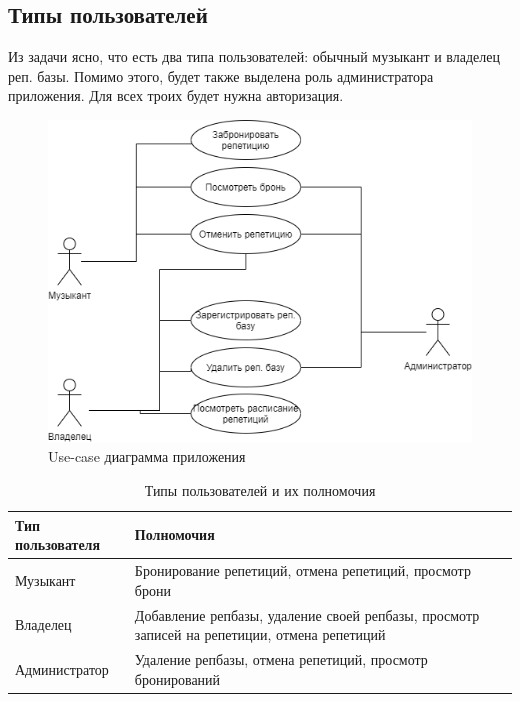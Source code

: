 \subsection{Типы пользователей}

Из задачи ясно, что есть два типа пользователей: обычный музыкант и владелец реп. базы. Помимо этого, будет также выделена роль администратора приложения. Для всех троих будет нужна авторизация.

\begin{figure}[h!]
	\begin{center}
		\includegraphics[scale=0.7]{inc/img/Use-Case.png}
	\end{center}
	\captionsetup{justification=centering}
	\caption{Use-case диаграмма приложения}
\end{figure}

\begin{table}[!h]
	\captionsetup{justification=centering}
	\caption{Типы пользователей и их полномочия}
	\begin{center}
		\begin{tabular}{|p{}|p{}|}
			\hline
			\textbf{Тип пользователя} & \textbf{Полномочия}\\
			\hline
			Музыкант & Бронирование репетиций, отмена репетиций, просмотр брони \\
			\hline
			Владелец & Добавление репбазы, удаление своей репбазы, просмотр записей на репетиции, отмена репетиций \\
			\hline
			Администратор & Удаление репбазы, отмена репетиций, просмотр бронирований \\
			\hline
		\end{tabular}
	\end{center}
\end{table}

